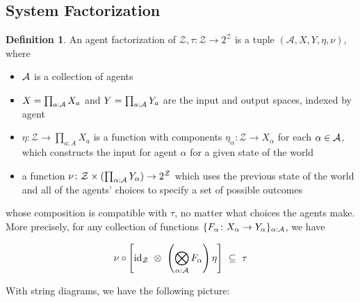 \documentclass{article}
\theoremstyle{definition}
\newtheorem{defn}{Definition}
\newcommand{\Z}{\mathcal Z}
\begin{document}
	\subsection{System Factorization}
	\begin{defn}
		An agent factorization of $\Z, \tau : \Z \to 2^\Z$ is a tuple $(\mathcal A, X, Y, \eta, \nu)$, where
		
		\begin{itemize}\setlength\itemsep{-0.4em}
			\item $\cal A$ is a collection of agents
			\item $X = \prod_{a : \cal A} X_a$ and $Y = \prod_{a : \cal A} Y_a$ are the input and output spaces, indexed by agent
			\item $\eta\colon \Z \to \prod_{a: A} X_a$ is a function with components $\eta_\alpha: \Z \to X_\alpha$ for each $\alpha \in \cal A$, which constructs the input for agent $\alpha$ for a given state of the world
			\item a function $\nu\colon \Z \times (\prod_{\alpha: \cal A} Y_\alpha) \to 2^\Z$ which uses the previous state of the world and all of the agents' choices to specify a set of possible outcomes
		\end{itemize}
		whose composition is compatible with $\tau$, no matter what choices the agents make. More precisely, for any collection of functions $\{F_\alpha\colon X_\alpha \to Y_\alpha\}_{\alpha : \cal A}$, we have
		
		\begin{equation} \label{eq:same}
		\nu \circ \left[ \mathrm{id}_\Z  ~\otimes~ \left(\bigotimes_{\alpha : \cal A} F_\alpha \right) \eta \right] ~\subseteq~\tau
		\end{equation} 
	\end{defn}
	
	
	With string diagrams, we have the following picture:
	\vspace{1em}
	\begin{center}
	\end{center}
\end{document}
